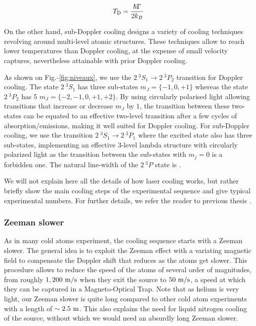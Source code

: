 \begin{equation}
    T_{\rm{D}} = \frac{\hbar \Gamma}{2 k_B}
\end{equation}

 On the other hand, sub-Doppler cooling designs a variety of cooling techniques revolving around multi-level atomic structures. These techniques allow to reach lower temperatures than Doppler cooling, at the expense of small velocity captures, nevertheless attainable with prior Doppler cooling. 

As shown on Fig.-\ref{fig:niveaux}, we use the $2 \ ^3 S_1 \rightarrow 2 \ ^3 P_2$ transition for Doppler cooling. The state $2 \ ^3 S_1$ has three sub-states $m_J=\{-1,0,+1\}$ whereas the state $2 \ ^3 P_2$ has 5 $m_J=\{-2,-1,0,+1,+2\}$. By using circularly polarised light allowing transitions that increase or decrease $m_J$ by $1$, the transition between these two-states can be equated to an effective two-level transition after a few cycles of absorption/emissions, making it well suited for Doppler cooling. For sub-Doppler cooling, we use the transition  $2 \ ^3 S_1 \rightarrow 2 \ ^3 P_1$ where the excited state also has three sub-states, implementing an effective 3-level lambda structure with circularly polarized light as the transition between the sub-states with $m_j=0$ is a forbidden one. The natural line-width of the $2 \ ^3 P$ state is .

We will not explain here all the details of how laser cooling works, but rather briefly show the main cooling steps of the experimental sequence and give typical experimental numbers. For further details, we refer the reader to previous thesis \cite{bouton_these,cayla_these,hoend2014}.



\subsubsection{Zeeman slower}

As in many cold atoms experiment, the cooling sequence starts with a Zeeman slower. The general idea is to exploit the Zeeman effect with a variating magnetic field to compensate the Doppler shift that reduces as the atoms get slower. This procedure allows to reduce the speed of the atoms of several order of magnitudes, from roughly $1,200 \ \rm{m/s}$ when they exit the source to $50 \ \rm{m/s}$, a speed at which they can be captured in a Magneto-Optical Trap. Note that as helium is very light, our Zeeman slower is quite long compared to other cold atom experiments with a length of $\sim 2.5 \ \rm{m}$. This also explains the need for liquid nitrogen cooling of the source, without which we would need an absurdly long Zeeman slower.

